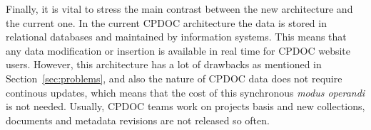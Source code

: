 Finally, it is vital to stress the main contrast between the new
architecture and the current one. In the current CPDOC architecture
the data is stored in relational databases and maintained by
information systems. This means that any data modification or
insertion is available in real time for CPDOC website users. However,
this architecture has a lot of drawbacks as mentioned in
Section~\ref{sec:problems}, and also the nature of CPDOC data does not
require continous updates, which means that the cost of this
synchronous \emph{modus operandi} is not needed. Usually, CPDOC teams
work on projects basis and new collections, documents and metadata
revisions are not released so often.





